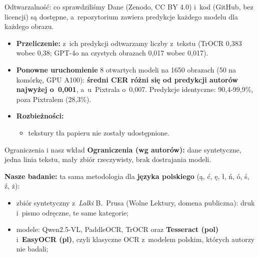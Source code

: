 \documentclass[aspectratio=169,11pt]{beamer}
\begin{document}
\begin{frame}{Odtwarzalność: co sprawdziliśmy}
  Dane (Zenodo, CC BY 4.0) i~kod (GitHub, bez licencji) są dostępne, a~repozytorium zawiera
  predykcje każdego modelu dla każdego obrazu.
  \begin{itemize}
    \item \textbf{Przeliczenie:} z~ich predykcji odtwarzamy liczby z~tekstu (TrOCR 0,383 wobec 0,38;
      GPT-4o na czystych obrazach 0,017 wobec 0,017).
    \item \textbf{Ponowne uruchomienie} 8 otwartych modeli na 1650 obrazach (50 na komórkę, GPU A100):
      \textbf{średni CER różni się od predykcji autorów najwyżej o~0,001}, a~u~Pixtrala o~0,007.
      Predykcje identyczne: 90,4-99,9\%, poza Pixtralem (28,3\%).
    \item \textbf{Rozbieżności:}
      \begin{itemize}

        \item tekstury tła papieru nie zostały udostępnione.
      \end{itemize}
  \end{itemize}
\end{frame}

\begin{frame}{Ograniczenia i nasz wkład}
  \textbf{Ograniczenia (wg autorów):} dane syntetyczne, jedna linia tekstu, mały zbiór rzeczywisty,
  brak dostrajania modeli.
  \medskip

  \textbf{Nasze badanie:} ta sama metodologia dla \textbf{języka polskiego} (ą, ć, ę, ł, ń, ó, ś, ź, ż):
  \begin{itemize}
    \item zbiór syntetyczny z~\emph{Lalki} B.~Prusa (Wolne Lektury, domena publiczna):
      druk i~pismo odręczne, te same kategorie;
    \item modele: Qwen2.5-VL, PaddleOCR, TrOCR oraz \textbf{Tesseract (pol)} i~\textbf{EasyOCR (pl)},
      czyli klasyczne OCR z~modelem polskim, których autorzy nie badali;
  \end{itemize}
\end{frame}
\end{document}

